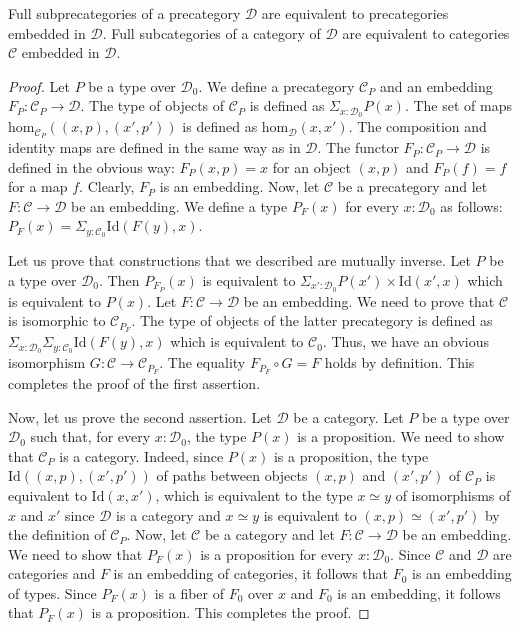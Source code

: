 \documentclass[reqno]{amsart}
\theoremstyle{definition}
\theoremstyle{remark}
\newcommand{\fs}[1]{\mathrm{#1}}
\newcommand{\scat}[1]{\mathcal{#1}}
\renewcommand{\hom}{\fs{hom}}
\newcommand{\Id}{\fs{Id}}
\newcommand{\ob}[1]{#1_0}
\newcommand{\fob}[1]{#1_0}
\numberwithin{figure}{section}
\begin{document}
\begin{lem}
Full subprecategories of a precategory $\scat{D}$ are equivalent to precategories embedded in $\scat{D}$.
Full subcategories of a category of $\scat{D}$ are equivalent to categories $\scat{C}$ embedded in $\scat{D}$.
\end{lem}
\begin{proof}
Let $P$ be a type over $\ob{\scat{D}}$.
We define a precategory $\scat{C}_P$ and an embedding $F_P : \scat{C}_P \to \scat{D}$.
The type of objects of $\scat{C}_P$ is defined as $\Sigma_{x : \ob{\scat{D}}} P(x)$.
The set of maps $\hom_{\scat{C}_P}((x,p),(x',p'))$ is defined as $\hom_\scat{D}(x,x')$.
The composition and identity maps are defined in the same way as in $\scat{D}$.
The functor $F_P : \scat{C}_P \to \scat{D}$ is defined in the obvious way: $F_P(x,p) = x$ for an object $(x,p)$ and $F_P(f) = f$ for a map $f$.
Clearly, $F_P$ is an embedding.
Now, let $\scat{C}$ be a precategory and let $F : \scat{C} \to \scat{D}$ be an embedding.
We define a type $P_F(x)$ for every $x : \ob{\scat{D}}$ as follows: $P_F(x) = \Sigma_{y : \ob{\scat{C}}} \Id(F(y),x)$.

Let us prove that constructions that we described are mutually inverse.
Let $P$ be a type over $\ob{\scat{D}}$.
Then $P_{F_P}(x)$ is equivalent to $\Sigma_{x' : \ob{\scat{D}}} P(x') \times \Id(x',x)$ which is equivalent to $P(x)$.
Let $F : \scat{C} \to \scat{D}$ be an embedding.
We need to prove that $\scat{C}$ is isomorphic to $\scat{C}_{P_F}$.
The type of objects of the latter precategory is defined as $\Sigma_{x : \ob{\scat{D}}} \Sigma_{y : \ob{\scat{C}}} \Id(F(y),x)$ which is equivalent to $\ob{\scat{C}}$.
Thus, we have an obvious isomorphism $G : \scat{C} \to \scat{C}_{P_F}$.
The equality $F_{P_F} \circ G = F$ holds by definition.
This completes the proof of the first assertion.

Now, let us prove the second assertion.
Let $\scat{D}$ be a category.
Let $P$ be a type over $\ob{\scat{D}}$ such that, for every $x : \ob{\scat{D}}$, the type $P(x)$ is a proposition.
We need to show that $\scat{C}_P$ is a category.
Indeed, since $P(x)$ is a proposition, the type $\Id((x,p),(x',p'))$ of paths between objects $(x,p)$ and $(x',p')$ of $\scat{C}_P$ is equivalent to $\Id(x,x')$,
which is equivalent to the type $x \simeq y$ of isomorphisms of $x$ and $x'$ since $\scat{D}$ is a category and $x \simeq y$ is equivalent to $(x,p) \simeq (x',p')$ by the definition of $\scat{C}_P$.
Now, let $\scat{C}$ be a category and let $F : \scat{C} \to \scat{D}$ be an embedding.
We need to show that $P_F(x)$ is a proposition for every $x : \ob{\scat{D}}$.
Since $\scat{C}$ and $\scat{D}$ are categories and $F$ is an embedding of categories, it follows that $\fob{F}$ is an embedding of types.
Since $P_F(x)$ is a fiber of $\fob{F}$ over $x$ and $\fob{F}$ is an embedding, it follows that $P_F(x)$ is a proposition.
This completes the proof.
\end{proof}
\end{document}
